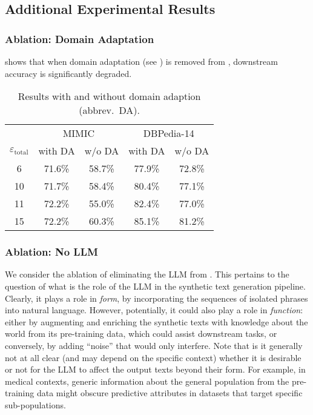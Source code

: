 \subsection{Additional Experimental Results}

\subsubsection{Ablation: Domain Adaptation}
 shows that when domain adaptation (see ) is removed from \alg, downstream accuracy is significantly degraded.

\begin{table*}
\caption{Results with and without domain adaption (abbrev.~DA).} \label{tbl:domainadaptation}
\centering
\begin{tabular}{c c c c c}
\toprule
 & \multicolumn{2}{c}{MIMIC} & \multicolumn{2}{c}{DBPedia-14} \\
 $\varepsilon_{\mathrm{total}}$ & with DA & w/o DA & with DA & w/o DA \\
\midrule
\rule{0pt}{3ex}
6 & 71.6\% & 58.7\% & 77.9\% & 72.8\% \\
10 & 71.7\% & 58.4\% & 80.4\% & 77.1\% \\
11 & 72.2\% & 55.0\% & 82.4\% & 77.0\% \\
15 & 72.2\% & 60.3\% & 85.1\% & 81.2\% \\
\bottomrule
\end{tabular}
\end{table*}

\subsubsection{Ablation: No LLM}\label{sec:nollm}
We consider the ablation of eliminating the LLM from \alg. 
This pertains to the question of what is the role of the LLM in the synthetic text generation pipeline. Clearly, it plays a role in \emph{form}, by incorporating the sequences of isolated phrases into natural language. However, potentially, it could also play a role in \emph{function}: either by augmenting and enriching the synthetic texts with knowledge about the world from its pre-training data, which could assist downstream tasks, or conversely, by adding ``noise'' that would only interfere. 
Note that is it generally not at all clear (and may depend on the specific context) whether it is desirable or not for the LLM to affect the output texts beyond their form. For example, in medical contexts, generic information about the general population from the pre-training data might obscure predictive attributes in datasets that target specific sub-populations.


